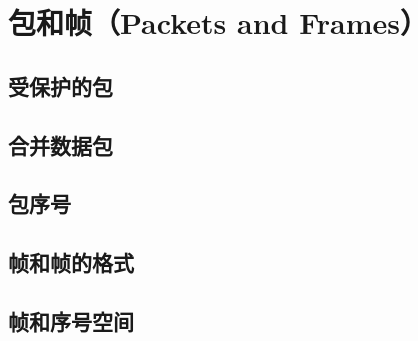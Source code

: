 \section{包和帧（Packets and Frames）}
\subsection{受保护的包}
\subsection{合并数据包}
\subsection{包序号}
\label{subsec:packet-numbers}
\subsection{帧和帧的格式}
\subsection{帧和序号空间}